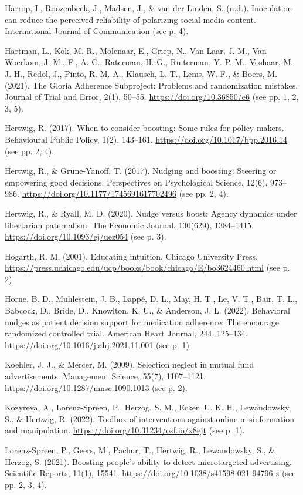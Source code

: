 \documentclass[reflection, authordate,issue]{jote-new-article}
\begin{document}
Harrop, I., Roozenbeek, J., Madsen, J., \& van der Linden, S. (n.d.). Inoculation can reduce the perceived reliability of polarizing social media content. International Journal of Communication (see p. 4).

Hartman, L., Kok, M. R., Molenaar, E., Griep, N., Van Laar, J. M., Van Woerkom, J. M., F., A. C., Raterman, H. G., Ruiterman, Y. P. M., Voshaar, M. J. H., Redol, J., Pinto, R. M. A., Klausch, L. T., Lems, W. F., \& Boers, M. (2021). The Gloria Adherence Subproject: Problems and randomization mistakes. Journal of Trial and Error, 2(1), 50–55. \url{https://doi.org/10.36850/e6} (see pp. 1, 2, 3, 5).

Hertwig, R. (2017). When to consider boosting: Some rules for policy-makers. Behavioural Public Policy, 1(2), 143–161. \url{https://doi.org/10.1017/bpp.2016.14} (see pp. 2, 4).

Hertwig, R., \& Grüne-Yanoff, T. (2017). Nudging and boosting: Steering or empowering good decisions. Perspectives on Psychological Science, 12(6), 973–986. \url{https://doi.org/10.1177/1745691617702496} (see pp. 2, 4).

Hertwig, R., \& Ryall, M. D. (2020). Nudge versus boost: Agency dynamics under libertarian paternalism. The Economic Journal, 130(629), 1384–1415. \url{https://doi.org/10.1093/ej/uez054} (see p. 3).

Hogarth, R. M. (2001). Educating intuition. Chicago University Press. \url{https://press.uchicago.edu/ucp/books/book/chicago/E/bo3624460.html} (see p. 2).

Horne, B. D., Muhlestein, J. B., Lappé, D. L., May, H. T., Le, V. T., Bair, T. L., Babcock, D., Bride, D., Knowlton, K. U., \& Anderson, J. L. (2022). Behavioral nudges as patient decision support for medication adherence: The encourage randomized controlled trial. American Heart Journal, 244, 125–134. \url{https://doi.org/10.1016/j.ahj.2021.11.001} (see p. 1).

Koehler, J. J., \& Mercer, M. (2009). Selection neglect in mutual fund advertisements. Management Science, 55(7), 1107–1121. \url{https://doi.org/10.1287/mnsc.1090.1013} (see p. 2).

Kozyreva, A., Lorenz-Spreen, P., Herzog, S. M., Ecker, U. K. H., Lewandowsky, S., \& Hertwig, R. (2022). Toolbox of interventions against online misinformation and manipulation. \url{https://doi.org/10.31234/osf.io/x8ejt} (see p. 1).

Lorenz-Spreen, P., Geers, M., Pachur, T., Hertwig, R., Lewandowsky, S., \& Herzog, S. (2021). Boosting people’s ability to detect microtargeted advertising. Scientific Reports, 11(1), 15541. \url{https://doi.org/10.1038/s41598-021-94796-z} (see pp. 2, 3, 4).
\end{document}
